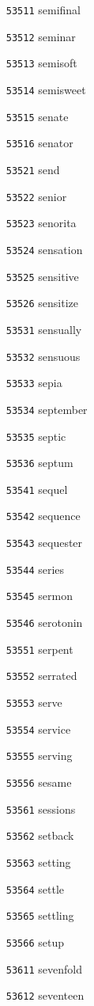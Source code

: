 \documentclass[twoside,11pt]{article}
\begin{document}
\begin{multicols}{5}
\begin{enumerate}
\item[\texttt{53511}] semifinal
\item[\texttt{53512}] seminar
\item[\texttt{53513}] semisoft
\item[\texttt{53514}] semisweet
\item[\texttt{53515}] senate
\item[\texttt{53516}] senator
\item[\texttt{53521}] send
\item[\texttt{53522}] senior
\item[\texttt{53523}] senorita
\item[\texttt{53524}] sensation
\item[\texttt{53525}] sensitive
\item[\texttt{53526}] sensitize
\item[\texttt{53531}] sensually
\item[\texttt{53532}] sensuous
\item[\texttt{53533}] sepia
\item[\texttt{53534}] september
\item[\texttt{53535}] septic
\item[\texttt{53536}] septum
\item[\texttt{53541}] sequel
\item[\texttt{53542}] sequence
\item[\texttt{53543}] sequester
\item[\texttt{53544}] series
\item[\texttt{53545}] sermon
\item[\texttt{53546}] serotonin
\item[\texttt{53551}] serpent
\item[\texttt{53552}] serrated
\item[\texttt{53553}] serve
\item[\texttt{53554}] service
\item[\texttt{53555}] serving
\item[\texttt{53556}] sesame
\item[\texttt{53561}] sessions
\item[\texttt{53562}] setback
\item[\texttt{53563}] setting
\item[\texttt{53564}] settle
\item[\texttt{53565}] settling
\item[\texttt{53566}] setup
\item[\texttt{53611}] sevenfold
\item[\texttt{53612}] seventeen

\end{enumerate}
\end{multicols}
\end{document}
